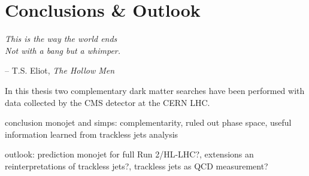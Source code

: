 \graphicspath{{chapt_dutch/}{intro/}{conclusions/}}

\renewcommand\evenpagerightmark{{\scshape\small Chapter 7}}
\renewcommand\oddpageleftmark{{\scshape\small Conclusions \& Outlook}}

\hyphenation{}

\chapter{Conclusions \& Outlook}

\begin{flushleft} 
\textit{This is the way the world ends\\
Not with a bang but a whimper.}
\end{flushleft}
\begin{flushright}
-- T.S. Eliot, \textit{The Hollow Men}
\end{flushright}

In this thesis two complementary dark matter searches have been performed with data collected by the \ac{CMS} detector at the CERN \ac{LHC}.

conclusion monojet and simps: complementarity, ruled out phase space, useful information learned from trackless jets analysis

outlook: prediction monojet for full Run 2/HL-LHC?, extensions an reinterpretations of trackless jets?, trackless jets as QCD measurement?


\clearpage{\pagestyle{empty}\cleardoublepage}
